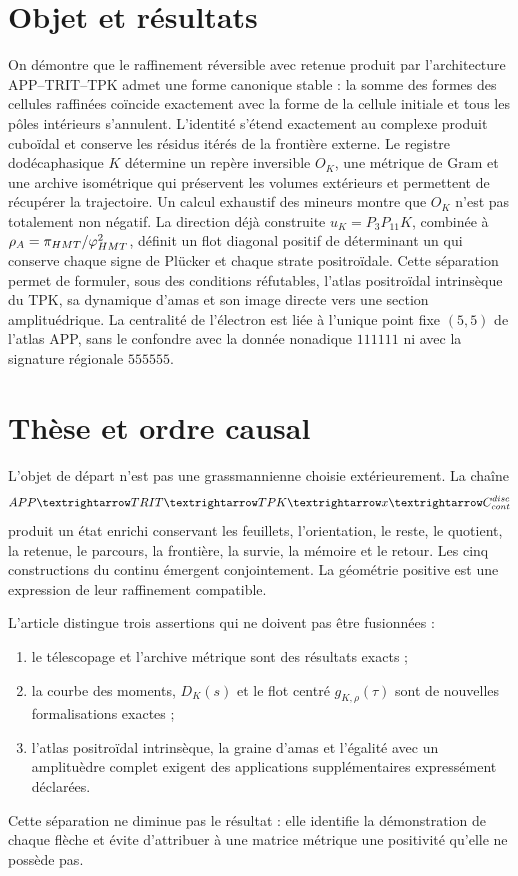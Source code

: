 


\section*{Objet et résultats}
On démontre que le raffinement réversible avec retenue produit par l’architecture APP--TRIT--TPK admet une forme canonique stable : la somme des formes des cellules raffinées coïncide exactement avec la forme de la cellule initiale et tous les pôles intérieurs s’annulent. L’identité s’étend exactement au complexe produit cuboïdal et conserve les résidus itérés de la frontière externe. Le registre dodécaphasique \(K\) détermine un repère inversible \(O_K\), une métrique de Gram et une archive isométrique qui préservent les volumes extérieurs et permettent de récupérer la trajectoire. Un calcul exhaustif des mineurs montre que \(O_K\) n’est pas totalement non négatif. La direction déjà construite \(u_K=P_3P_{11}K\), combinée à \(\rho_A=\pi_{\rm HMT}/\varphi_{\rm HMT}^2\), définit un flot diagonal positif de déterminant un qui conserve chaque signe de Plücker et chaque strate positroïdale. Cette séparation permet de formuler, sous des conditions réfutables, l’atlas positroïdal intrinsèque du TPK, sa dynamique d’amas et son image directe vers une section amplituédrique. La centralité de l’électron est liée à l’unique point fixe \((5,5)\) de l’atlas APP, sans le confondre avec la donnée nonadique \(111111\) ni avec la signature régionale \(555555\).


\section{Thèse et ordre causal}

L’objet de départ n’est pas une grassmannienne choisie extérieurement. La chaîne
\[
\APP\longrightarrow\mathrm{TRIT}\longrightarrow\TPK
\longrightarrow\widehat x
\longrightarrow\mathcal C_{\rm cont}^{\rm disc}
\]
produit un état enrichi conservant les feuillets, l’orientation, le reste, le quotient, la retenue, le parcours, la frontière, la survie, la mémoire et le retour. Les cinq constructions du continu émergent conjointement. La géométrie positive est une expression de leur raffinement compatible.

L’article distingue trois assertions qui ne doivent pas être fusionnées :
\begin{enumerate}
\item le télescopage et l’archive métrique sont des résultats exacts ;
\item la courbe des moments, \(D_K(s)\) et le flot centré \(g_{K,\rho}(\tau)\) sont de nouvelles formalisations exactes ;
\item l’atlas positroïdal intrinsèque, la graine d’amas et l’égalité avec un amplituèdre complet exigent des applications supplémentaires expressément déclarées.
\end{enumerate}
Cette séparation ne diminue pas le résultat : elle identifie la démonstration de chaque flèche et évite d’attribuer à une matrice métrique une positivité qu’elle ne possède pas.

